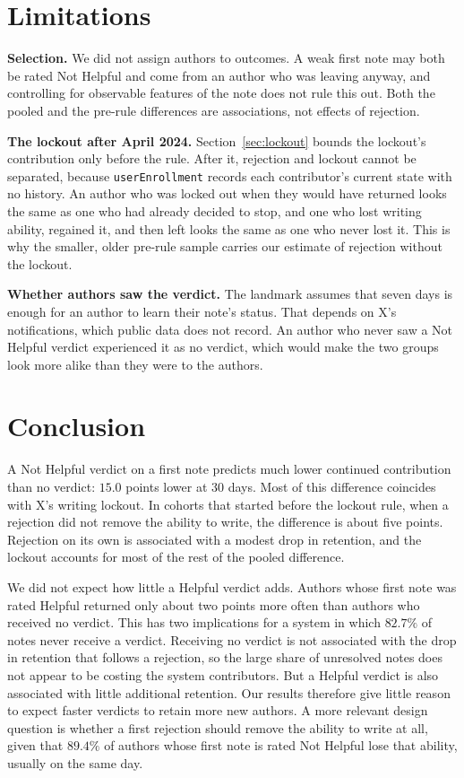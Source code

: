\documentclass[sigconf,nonacm]{acmart}
\begin{document}
\section{Limitations}

\textbf{Selection.} We did not assign authors to outcomes. A weak first note may both be
rated Not Helpful and come from an author who was leaving anyway, and controlling for
observable features of the note does not rule this out. Both the pooled and the pre-rule
differences are associations, not effects of rejection.

\textbf{The lockout after April 2024.} Section~\ref{sec:lockout} bounds the lockout's
contribution only before the rule. After it, rejection and lockout cannot be separated,
because \texttt{userEnrollment} records each contributor's current state with no history.
An author who was locked out when they would have returned looks the same as one who had
already decided to stop, and one who lost writing ability, regained it, and then left looks
the same as one who never lost it. This is why the smaller, older pre-rule sample carries
our estimate of rejection without the lockout.

\textbf{Whether authors saw the verdict.} The landmark assumes that seven days is enough
for an author to learn their note's status. That depends on X's notifications, which public
data does not record. An author who never saw a Not Helpful verdict experienced it as no
verdict, which would make the two groups look more alike than they were to the authors.

\section{Conclusion}

A Not Helpful verdict on a first note predicts much lower continued contribution than no
verdict: $15.0$ points lower at 30 days. Most of this difference coincides with X's writing
lockout. In cohorts that started before the lockout rule, when a rejection did not remove
the ability to write, the difference is about five points. Rejection on its own is
associated with a modest drop in retention, and the lockout accounts for most of the rest
of the pooled difference.

We did not expect how little a Helpful verdict adds. Authors whose first note was rated
Helpful returned only about two points more often than authors who received no verdict.
This has two implications for a system in which $82.7\%$ of notes never receive a verdict.
Receiving no verdict is not associated with the drop in retention that follows a
rejection, so the large share of unresolved notes does not appear to be costing the system
contributors. But a Helpful verdict is also associated with little additional retention.
Our results therefore give little reason to expect faster verdicts to retain more new
authors. A more relevant design question is whether a first rejection should remove the
ability to write at all, given that $89.4\%$ of authors whose first note is rated Not
Helpful lose that ability, usually on the same day.
\end{document}
